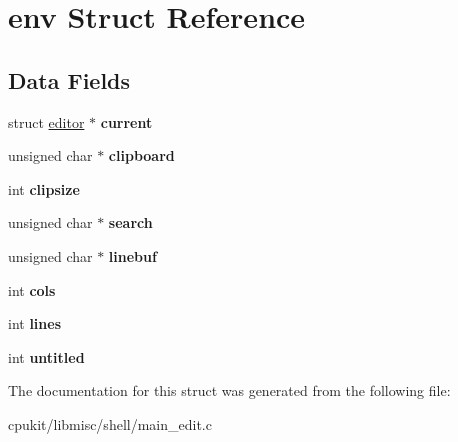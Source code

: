 \hypertarget{structenv}{}\section{env Struct Reference}
\label{structenv}
\subsection*{Data Fields}
\begin{DoxyCompactItemize}
\item 
\mbox{\label{structenv_a726f2a2a7fe1a04b8c092bd30e840df0}} 
struct \mbox{\hyperlink{structeditor}{editor}} $\ast$ {\bfseries current}
\item 
\mbox{\label{structenv_a96e3fd7ce74b0385570739f28393fe78}} 
unsigned char $\ast$ {\bfseries clipboard}
\item 
\mbox{\label{structenv_ad9cc34be052dad746d2f4bcfb3fdcda7}} 
int {\bfseries clipsize}
\item 
\mbox{\label{structenv_a9a9836813aec8a63d6c4af483bb77de8}} 
unsigned char $\ast$ {\bfseries search}
\item 
\mbox{\label{structenv_ab6c15125f968dfc5f7990ca7cdcc88a0}} 
unsigned char $\ast$ {\bfseries linebuf}
\item 
\mbox{\label{structenv_a5da2e343de9206870981a33f6b9b8225}} 
int {\bfseries cols}
\item 
\mbox{\label{structenv_ace78bffaa4bfd073561851e2bba73400}} 
int {\bfseries lines}
\item 
\mbox{\label{structenv_a8e03f667d87eb86a46ea158658620d99}} 
int {\bfseries untitled}
\end{DoxyCompactItemize}


The documentation for this struct was generated from the following file\+:\begin{DoxyCompactItemize}
\item 
cpukit/libmisc/shell/main\+\_\+edit.\+c\end{DoxyCompactItemize}
